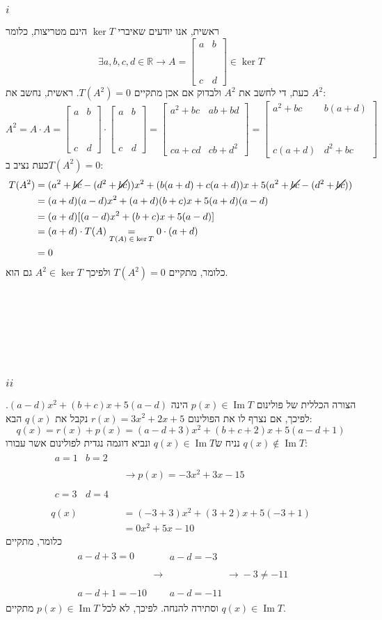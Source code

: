 \documentclass[11pt, oneside]{article}
\newcommand{\qed}{\R{$\blacksquare$}}
\newcommand{\br}{\\\\\\\\\\\\\\}
\newcommand{\opr}[1]{\xrightarrow[\text{#1}]{}}
\newcommand{\ueq}[1]{\underset{\text{#1}}{=}}
\newcommand{\mR}{\mathbb{R}}
\DeclareMathOperator{\Ima}{Im}
\newcommand{\fim}[4]{\begin{bmatrix}#1 & #2 \br #3 & #4\end{bmatrix}}
\begin{document}
\subsubsection{$i$}
ראשית, אנו יודעים שאיברי $\ker{T}$ הינם מטריצות, כלומר
\[
\exists a, b, c, d \in \mR \opr{} A = \fim{a}{b}{c}{d} \in \ker{T}
\]
כעת, די לחשב את $A^2$ ולבדוק אם אכן מתקיים $T(A^2) = 0$. ראשית, נחשב את $A^2$:
\[
A^2 =
A \cdot A =
\fim{a}{b}{c}{d} \cdot \fim{a}{b}{c}{d} =
\fim{a^2 + bc}{ab + bd}{ca + cd}{cb + d^2} =
\fim{a^2 + bc}{b(a + d)}{c(a + d)}{d^2 + bc}
\]
כעת נציב ב$T(A^2) = 0$:
\begin{align*}
T(A^2)
& = (a^2 + \cancel{bc} - (d^2 + \cancel{bc}))x^2 + (b(a + d) + c(a + d))x + 5(a^2 + \cancel{bc} - (d^2 + \cancel{bc}))\\
& = (a + d)(a - d)x^2 + (a + d)(b + c)x + 5(a + d)(a - d)\\
& = (a + d)[(a - d)x^2 + (b + c)x + 5(a - d)]\\
& = (a + d) \cdot T(A) \ueq{$T(A) \in \ker{T}$} 0 \cdot (a + d)\\
& = 0
\end{align*}
כלומר, מתקיים $T(A^2) = 0$ ולפיכך $A^2 \in \ker{T}$ גם הוא.
\br\qed

\subsubsection{$ii$}
הצורה הכללית של פולינום $p(x) \in \Ima{T}$ הינה $(a-d)x^2 + (b+c)x + 5(a-d)$. לפיכך, אם נצרף לו את הפולינום $r(x) = 3x^2 + 2x + 5$ נקבל את $q(x)$ הבא:
\[
q(x) = r(x) + p(x) = (a-d+3)x^2 + (b+c+2)x + 5(a-d+1)
\]
נניח ש$q(x) \in \Ima{T}$ ונביא דוגמה נגדית לפולינום אשר עבורו $q(x) \not\in \Ima{T}$:
\begin{align*}
\begin{matrix}
a = 1 & b = 2\br
c = 3 & d = 4
\end{matrix}\;
& \opr{}
p(x) = -3x^2 + 3x - 15\\\\
q(x)
& = (-3 + 3)x^2 + (3 + 2)x + 5(-3+1)\\
& = 0x^2 + 5x - 10
\end{align*}
כלומר, מתקיים
\begin{align*}
\begin{matrix}
a - d + 3 = 0\br
a - d + 1 = -10
\end{matrix}
\opr{}
\begin{matrix}
a - d = -3\br
a - d = -11
\end{matrix}
\opr{}
-3 \neq -11
\end{align*}
וסתירה להנחה. לפיכך, לא לכל $p(x) \in \Ima{T}$ מתקיים $q(x) \in \Ima{T}$.
\br\qed
\clearpage
\end{document}
